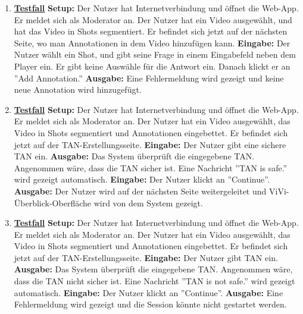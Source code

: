 \begin{enumerate}
	\item \underline{\textbf{Testfall}} \linebreak
	\textbf{Setup:} Der Nutzer hat Internetverbindung und öffnet die Web-App. Er meldet sich als Moderator an. Der Nutzer hat ein Video ausgewählt, und hat das Video in Shots segmentiert. Er befindet sich jetzt auf der nächsten Seite, wo man Annotationen in dem Video hinzufügen kann.\linebreak
	\textbf{Eingabe:} Der Nutzer wählt ein Shot, und gibt seine Frage in einem Eingabefeld neben dem Player ein. Er gibt keine Auswähle für die Antwort ein. Danach klickt er an ''Add Annotation.''\linebreak
	\textbf{Ausgabe:} Eine Fehlermeldung wird gezeigt und keine neue Annotation wird hinzugefügt.
	
	\item \underline{\textbf{Testfall}} \linebreak
	\textbf{Setup:} Der Nutzer hat Internetverbindung und öffnet die Web-App. Er meldet sich als Moderator an. Der Nutzer hat ein Video ausgewählt, das Video in Shots segmentiert und Annotationen eingebettet. Er befindet sich jetzt auf der TAN-Erstellungsseite.\linebreak
	\textbf{Eingabe:} Der Nutzer gibt eine sichere TAN ein.\linebreak
	\textbf{Ausgabe:} Das System überprüft die eingegebene TAN. Angenommen wäre, dass die TAN sicher ist. Eine Nachricht ''TAN is safe.'' wird gezeigt automatisch.\linebreak
	\textbf{Eingabe:} Der Nutzer klickt an ''Continue''.\linebreak
	\textbf{Ausgabe:} Der Nutzer wird auf der nächsten Seite weitergeleitet und ViVi-Überblick-Oberfläche wird von dem System gezeigt.
	
	\item \underline{\textbf{Testfall}} \linebreak
	\textbf{Setup:} Der Nutzer hat Internetverbindung und öffnet die Web-App. Er meldet sich als Moderator an. Der Nutzer hat ein Video ausgewählt, das Video in Shots segmentiert und Annotationen eingebettet. Er befindet sich jetzt auf der TAN-Erstellungsseite.\linebreak
	\textbf{Eingabe:} Der Nutzer gibt TAN ein.\linebreak
	\textbf{Ausgabe:} Das System überprüft die eingegebene TAN. Angenommen wäre, dass die TAN nicht sicher ist. Eine Nachricht ''TAN is not safe.'' wird gezeigt automatisch.\linebreak
	\textbf{Eingabe:} Der Nutzer klickt an ''Continue''.\linebreak
	\textbf{Ausgabe:} Eine Fehlermeldung wird gezeigt und die Session könnte nicht gestartet werden.
	

\end{enumerate}

